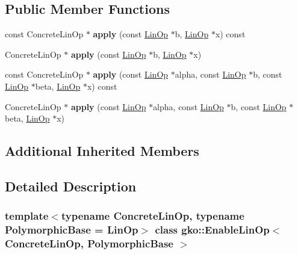 \subsection*{Public Member Functions}
\begin{DoxyCompactItemize}
\item 
\mbox{\label{classgko_1_1EnableLinOp_a28a3c32ed2934695b46969533db050da}} 
const Concrete\+Lin\+Op $\ast$ {\bfseries apply} (const \hyperlink{classgko_1_1LinOp}{Lin\+Op} $\ast$b, \hyperlink{classgko_1_1LinOp}{Lin\+Op} $\ast$x) const
\item 
\mbox{\label{classgko_1_1EnableLinOp_a5ef59aa10996368ac05ed1c10c9f6477}} 
Concrete\+Lin\+Op $\ast$ {\bfseries apply} (const \hyperlink{classgko_1_1LinOp}{Lin\+Op} $\ast$b, \hyperlink{classgko_1_1LinOp}{Lin\+Op} $\ast$x)
\item 
\mbox{\label{classgko_1_1EnableLinOp_a24ed2f449d96048dd82a6e9539bdabf6}} 
const Concrete\+Lin\+Op $\ast$ {\bfseries apply} (const \hyperlink{classgko_1_1LinOp}{Lin\+Op} $\ast$alpha, const \hyperlink{classgko_1_1LinOp}{Lin\+Op} $\ast$b, const \hyperlink{classgko_1_1LinOp}{Lin\+Op} $\ast$beta, \hyperlink{classgko_1_1LinOp}{Lin\+Op} $\ast$x) const
\item 
\mbox{\label{classgko_1_1EnableLinOp_ac34196c794c3b256c0007f1f97109664}} 
Concrete\+Lin\+Op $\ast$ {\bfseries apply} (const \hyperlink{classgko_1_1LinOp}{Lin\+Op} $\ast$alpha, const \hyperlink{classgko_1_1LinOp}{Lin\+Op} $\ast$b, const \hyperlink{classgko_1_1LinOp}{Lin\+Op} $\ast$beta, \hyperlink{classgko_1_1LinOp}{Lin\+Op} $\ast$x)
\end{DoxyCompactItemize}
\subsection*{Additional Inherited Members}


\subsection{Detailed Description}
\subsubsection*{template$<$typename Concrete\+Lin\+Op, typename Polymorphic\+Base = Lin\+Op$>$\newline
class gko\+::\+Enable\+Lin\+Op$<$ Concrete\+Lin\+Op, Polymorphic\+Base $>$}

